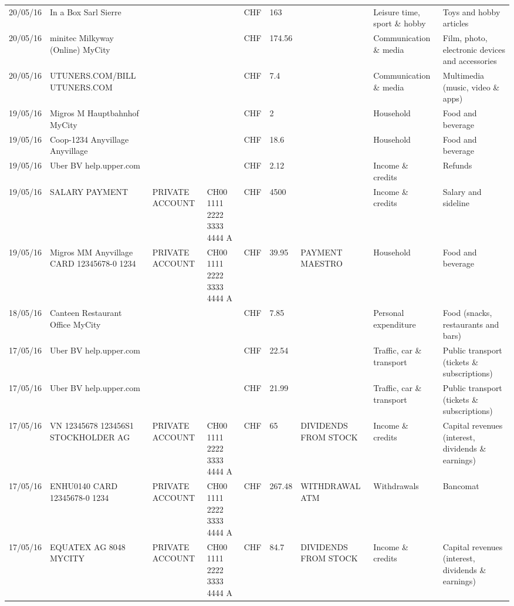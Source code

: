 \begin{landscape}
\begin{center}
\begin{longtable}{lllllllll}
		20/05/16 & In a Box Sarl            Sierre &       &       & CHF   & 163   &       & Leisure time, sport \& hobby & Toys and hobby articles \\
		20/05/16 & minitec Milkyway (Online) MyCity &       &       & CHF   & 174.56 &       & Communication \& media & Film, photo, electronic devices and accessories \\
		20/05/16 & UTUNERS.COM/BILL          UTUNERS.COM &       &       & CHF   & 7.4   &       & Communication \& media & Multimedia (music, video \& apps) \\
		19/05/16 & Migros M Hauptbahnhof    MyCity &       &       & CHF   & 2     &       & Household & Food and beverage \\
		19/05/16 & Coop-1234 Anyvillage    Anyvillage &       &       & CHF   & 18.6  &       & Household & Food and beverage \\
		19/05/16 & Uber BV                  help.upper.com &       &       & CHF   & 2.12  &       & Income \& credits & Refunds \\
		19/05/16 & SALARY PAYMENT & PRIVATE ACCOUNT & CH00 1111 2222 3333 4444 A & CHF   & 4500  &       & Income \& credits & Salary and sideline \\
		19/05/16 & Migros MM Anyvillage CARD 12345678-0 1234 & PRIVATE ACCOUNT & CH00 1111 2222 3333 4444 A & CHF   & 39.95 & PAYMENT MAESTRO & Household & Food and beverage \\
		18/05/16 & Canteen Restaurant Office      MyCity &       &       & CHF   & 7.85  &       & Personal expenditure & Food (snacks, restaurants and bars) \\
		17/05/16 & Uber BV                  help.upper.com &       &       & CHF   & 22.54 &       & Traffic, car \& transport & Public transport (tickets \& subscriptions) \\
		17/05/16 & Uber BV                  help.upper.com &       &       & CHF   & 21.99 &       & Traffic, car \& transport & Public transport (tickets \& subscriptions) \\
		17/05/16 & VN 12345678     123456S1 STOCKHOLDER AG & PRIVATE ACCOUNT & CH00 1111 2222 3333 4444 A & CHF   & 65    & DIVIDENDS FROM STOCK & Income \& credits & Capital revenues (interest, dividends \& earnings) \\
		17/05/16 & ENHU0140 CARD 12345678-0 1234 & PRIVATE ACCOUNT & CH00 1111 2222 3333 4444 A & CHF   & 267.48 & WITHDRAWAL ATM & Withdrawals & Bancomat \\
		17/05/16 & EQUATEX AG 8048 MYCITY & PRIVATE ACCOUNT & CH00 1111 2222 3333 4444 A & CHF   & 84.7  & DIVIDENDS FROM STOCK & Income \& credits & Capital revenues (interest, dividends \& earnings) \\

\end{longtable}
\end{center}
\end{landscape}
